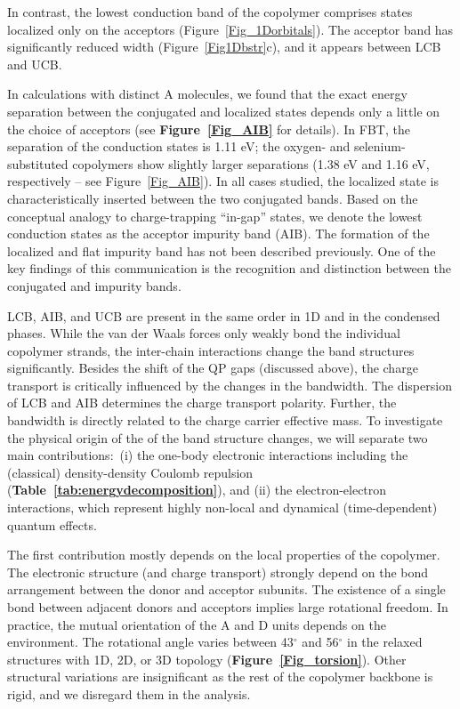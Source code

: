 \documentclass[journal = jpclcd]{achemso}
\begin{document}
In contrast, the lowest conduction band of the copolymer comprises states localized only on the acceptors (Figure~\ref{Fig_1Dorbitals}).  The acceptor band has significantly reduced width (Figure~\ref{Fig1Dbstr}c), and it appears between LCB and UCB.

In calculations with distinct A molecules, we found that the exact energy separation between the conjugated and localized states depends only a little on the choice of acceptors (see \textbf{Figure~\ref{Fig_AIB}} for details). In FBT, the separation of the conduction states is 1.11 eV; the oxygen- and selenium- substituted copolymers show slightly larger separations (1.38 eV and 1.16 eV, respectively -- see Figure~\ref{Fig_AIB}). In all cases studied, the localized state is characteristically inserted between the two conjugated bands. Based on the conceptual analogy to charge-trapping  ``in-gap'' states, we denote the lowest conduction states as the acceptor impurity band (AIB).  The formation of the localized and flat impurity band has not been described previously. One of the key findings of this communication is the recognition and distinction between the conjugated and impurity bands.

LCB, AIB, and UCB are present in the same order in 1D and in the condensed phases. While the van der Waals forces only weakly bond the individual copolymer strands, the inter-chain interactions change the band structures significantly. Besides the shift of the QP gaps (discussed above), the charge transport is critically influenced by the changes in the bandwidth. The dispersion of LCB and AIB  determines the charge transport polarity. Further,  the bandwidth is directly related to the charge carrier effective mass. To investigate the physical origin of the of the band structure changes, we will separate two main contributions: (i) the one-body electronic interactions\cite{onebodyterm} including the (classical) density-density Coulomb repulsion (\textbf{Table~\ref{tab:energydecomposition}}), and (ii) the electron-electron interactions,  which represent highly non-local and dynamical (time-dependent) quantum effects. 

The first contribution mostly depends on the local\cite{localproperties} properties of the copolymer. The electronic structure (and charge transport) strongly depend on the bond arrangement between the donor and acceptor subunits.\cite{Bredas1985}  The existence of a single bond between adjacent donors and acceptors implies large rotational freedom.  In practice, the mutual orientation of the A and D units depends on the environment. The rotational angle varies between 43$^\circ$ and 56$^\circ$ in the relaxed structures with 1D, 2D, or 3D topology (\textbf{Figure~\ref{Fig_torsion}}). Other structural variations are insignificant as the rest of the copolymer backbone is rigid, and we disregard them in the analysis.
\end{document}
